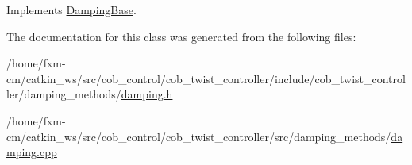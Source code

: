 Implements \hyperlink{classDampingBase}{Damping\-Base}.



The documentation for this class was generated from the following files\-:\begin{DoxyCompactItemize}
\item 
/home/fxm-\/cm/catkin\-\_\-ws/src/cob\-\_\-control/cob\-\_\-twist\-\_\-controller/include/cob\-\_\-twist\-\_\-controller/damping\-\_\-methods/\hyperlink{damping_8h}{damping.\-h}\item 
/home/fxm-\/cm/catkin\-\_\-ws/src/cob\-\_\-control/cob\-\_\-twist\-\_\-controller/src/damping\-\_\-methods/\hyperlink{damping_8cpp}{damping.\-cpp}\end{DoxyCompactItemize}
